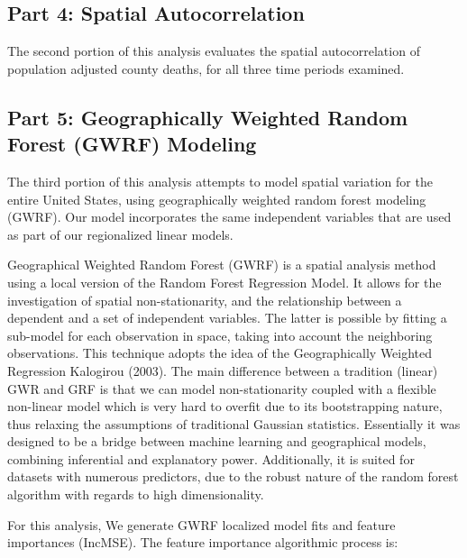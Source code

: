 \documentclass[
]{article}
\begin{document}
\newpage

\hypertarget{part-4-spatial-autocorrelation}{%
\subsection{Part 4: Spatial
Autocorrelation}\label{part-4-spatial-autocorrelation}}

The second portion of this analysis evaluates the spatial
autocorrelation of population adjusted county deaths, for all three time
periods examined.

\hypertarget{part-5-geographically-weighted-random-forest-gwrf-modeling}{%
\subsection{Part 5: Geographically Weighted Random Forest (GWRF)
Modeling}\label{part-5-geographically-weighted-random-forest-gwrf-modeling}}

The third portion of this analysis attempts to model spatial variation
for the entire United States, using geographically weighted random
forest modeling (GWRF). Our model incorporates the same independent
variables that are used as part of our regionalized linear models.

Geographical Weighted Random Forest (GWRF) is a spatial analysis method
using a local version of the Random Forest Regression Model. It allows
for the investigation of spatial non-stationarity, and the relationship
between a dependent and a set of independent variables. The latter is
possible by fitting a sub-model for each observation in space, taking
into account the neighboring observations. This technique adopts the
idea of the Geographically Weighted Regression Kalogirou (2003). The
main difference between a tradition (linear) GWR and GRF is that we can
model non-stationarity coupled with a flexible non-linear model which is
very hard to overfit due to its bootstrapping nature, thus relaxing the
assumptions of traditional Gaussian statistics. Essentially it was
designed to be a bridge between machine learning and geographical
models, combining inferential and explanatory power. Additionally, it is
suited for datasets with numerous predictors, due to the robust nature
of the random forest algorithm with regards to high dimensionality.

For this analysis, We generate GWRF localized model fits and feature
importances (IncMSE). The feature importance algorithmic process is:
\end{document}
